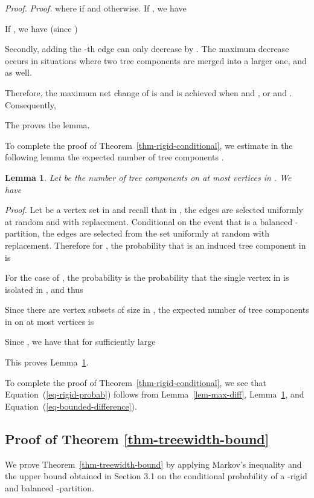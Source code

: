 \documentclass[11pt]{article}
\newtheorem{lemma}{Lemma}[section]
\providecommand{\qed}{\hfill }
\newenvironment{proof}[0]{\textit{Proof.} }{\hfill  \qed}
\begin{document}
\begin{proof}
\begin{proof}
where  if  and  otherwise. 
If , we have
 
If , we have (since )
     
Secondly, adding the -th edge can only decrease  by . The maximum
decrease occurs in situations where two tree components are merged into a larger one, and
 as well. 

Therefore, the maximum net change of  is  and is achieved when 
 and , or    
 and . Consequently, 

The proves the lemma.
\end{proof}

To complete the proof of Theorem~\ref{thm-rigid-conditional}, we estimate in the following 
lemma the expected number of tree components .   
\begin{lemma}
\label{lem-expected-tree}
Let  be the number of tree components on at most  vertices in . 
We have 
 
\end{lemma}
\begin{proof}
Let  be a vertex set in  and recall that in , the 
 edges are selected uniformly at random and with replacement. Conditional on the 
event that  is a balanced -partition, the  edges are
selected from the set  uniformly at random with replacement. Therefore for 
, the probability that  is an induced tree component in  is

For the case of , the probability  is the 
probability that the single vertex in  is isolated in , and thus

Since there are  vertex subsets of size  in , the expected 
number of tree components in  on at most  vertices is

Since ,
we have that for sufficiently large 

This proves Lemma~\ref{lem-expected-tree}.
\end{proof}

To complete the proof of Theorem~\ref{thm-rigid-conditional}, we see that
Equation~(\ref{eq-rigid-probab}) follows from 
Lemma~\ref{lem-max-diff}, Lemma~\ref{lem-expected-tree}, 
and Equation~(\ref{eq-bounded-difference}). 
\end{proof}

 
\subsection{Proof of Theorem \ref{thm-treewidth-bound}}
We prove Theorem~\ref{thm-treewidth-bound} by applying Markov's inequality and 
the upper bound obtained in Section 3.1 on the conditional probability
of a -rigid and balanced -partition. 
\end{document}
